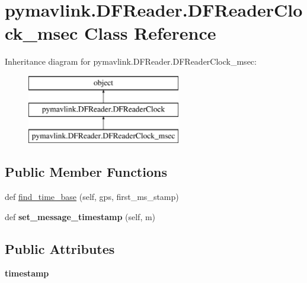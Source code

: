 \hypertarget{classpymavlink_1_1DFReader_1_1DFReaderClock__msec}{}\section{pymavlink.\+D\+F\+Reader.\+D\+F\+Reader\+Clock\+\_\+msec Class Reference}
\label{classpymavlink_1_1DFReader_1_1DFReaderClock__msec}
Inheritance diagram for pymavlink.\+D\+F\+Reader.\+D\+F\+Reader\+Clock\+\_\+msec\+:\begin{figure}[H]
\begin{center}
\leavevmode
\includegraphics[height=3.000000cm]{classpymavlink_1_1DFReader_1_1DFReaderClock__msec}
\end{center}
\end{figure}
\subsection*{Public Member Functions}
\begin{DoxyCompactItemize}
\item 
def \hyperlink{classpymavlink_1_1DFReader_1_1DFReaderClock__msec_a175357de9e67b92d2977d9aab2a3fe1a}{find\+\_\+time\+\_\+base} (self, gps, first\+\_\+ms\+\_\+stamp)
\item 
\mbox{\label{classpymavlink_1_1DFReader_1_1DFReaderClock__msec_a66a8cb335b6ff41e1390e9a8e9bf292a}} 
def {\bfseries set\+\_\+message\+\_\+timestamp} (self, m)
\end{DoxyCompactItemize}
\subsection*{Public Attributes}
\begin{DoxyCompactItemize}
\item 
\mbox{\label{classpymavlink_1_1DFReader_1_1DFReaderClock__msec_a98740f18c4eded09309955cc7fbbb44c}} 
{\bfseries timestamp}
\end{DoxyCompactItemize}


